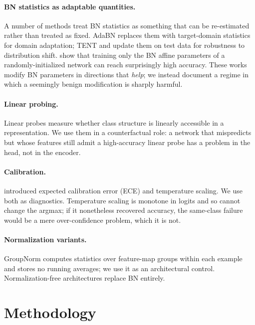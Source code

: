 \documentclass{article}
\begin{document}
\paragraph{BN statistics as adaptable quantities.} A number of methods treat BN statistics as something that can be re-estimated rather than treated as fixed. AdaBN \citep{li2018revisiting} replaces them with target-domain statistics for domain adaptation; TENT \citep{wang2021tent} and \citet{schneider2020improving} update them on test data for robustness to distribution shift. \citet{frankle2020training} show that training only the BN affine parameters of a randomly-initialized network can reach surprisingly high accuracy. These works modify BN parameters in directions that \emph{help}; we instead document a regime in which a seemingly benign modification is sharply harmful.

\paragraph{Linear probing.} Linear probes \citep{alain2016understanding,kornblith2019similarity} measure whether class structure is linearly accessible in a representation. We use them in a counterfactual role: a network that mispredicts but whose features still admit a high-accuracy linear probe has a problem in the head, not in the encoder.

\paragraph{Calibration.} \citet{guo2017calibration} introduced expected calibration error (ECE) and temperature scaling. We use both as diagnostics. Temperature scaling is monotone in logits and so cannot change the argmax; if it nonetheless recovered accuracy, the same-class failure would be a mere over-confidence problem, which it is not.

\paragraph{Normalization variants.} GroupNorm \citep{wu2018group} computes statistics over feature-map groups within each example and stores no running averages; we use it as an architectural control. Normalization-free architectures \citep{brock2021high} replace BN entirely.

\section{Methodology}
\label{sec:method}
\end{document}
